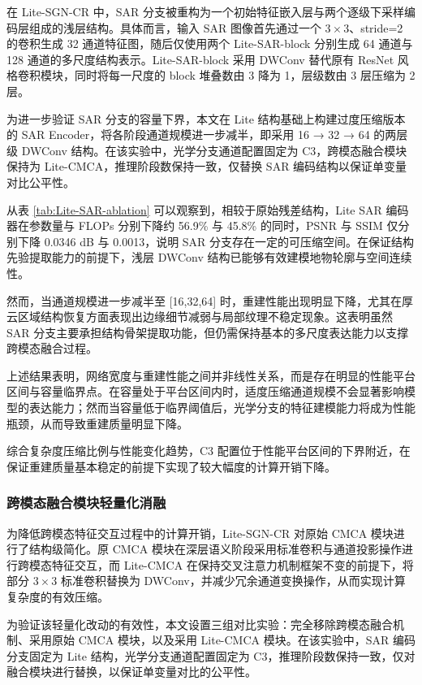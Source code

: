 在 Lite-SGN-CR 中，SAR 分支被重构为一个初始特征嵌入层与两个逐级下采样编码层组成的浅层结构。具体而言，输入 SAR 图像首先通过一个 $3\times3$、stride=2 的卷积生成 32 通道特征图，随后仅使用两个 Lite-SAR-block 分别生成 64 通道与 128 通道的多尺度结构表示。Lite-SAR-block 采用 DWConv 替代原有 ResNet 风格卷积模块，同时将每一尺度的 block 堆叠数由 3 降为 1，层级数由 3 层压缩为 2 层。

为进一步验证 SAR 分支的容量下界，本文在 Lite 结构基础上构建过度压缩版本的 SAR Encoder，将各阶段通道规模进一步减半，即采用 16 → 32 → 64 的两层级 DWConv 结构。在该实验中，光学分支通道配置固定为 C3，跨模态融合模块保持为 Lite-CMCA，推理阶段数保持一致，仅替换 SAR 编码结构以保证单变量对比公平性。

从表 \ref{tab:Lite-SAR-ablation} 可以观察到，相较于原始残差结构，Lite SAR 编码器在参数量与 FLOPs 分别下降约 56.9\% 与 45.8\% 的同时，PSNR 与 SSIM 仅分别下降 0.0346 dB 与 0.0013，说明 SAR 分支存在一定的可压缩空间。在保证结构先验提取能力的前提下，浅层 DWConv 结构已能够有效建模地物轮廓与空间连续性。

然而，当通道规模进一步减半至 [16,32,64] 时，重建性能出现明显下降，尤其在厚云区域结构恢复方面表现出边缘细节减弱与局部纹理不稳定现象。这表明虽然 SAR 分支主要承担结构骨架提取功能，但仍需保持基本的多尺度表达能力以支撑跨模态融合过程。

上述结果表明，网络宽度与重建性能之间并非线性关系，而是存在明显的性能平台区间与容量临界点。在容量处于平台区间内时，适度压缩通道规模不会显著影响模型的表达能力；然而当容量低于临界阈值后，光学分支的特征建模能力将成为性能瓶颈，从而导致重建质量明显下降。

综合复杂度压缩比例与性能变化趋势，C3 配置位于性能平台区间的下界附近，在保证重建质量基本稳定的前提下实现了较大幅度的计算开销下降。

\subsubsection{跨模态融合模块轻量化消融}

为降低跨模态特征交互过程中的计算开销，Lite-SGN-CR 对原始 CMCA 模块进行了结构级简化。原 CMCA 模块在深层语义阶段采用标准卷积与通道投影操作进行跨模态特征交互，而 Lite-CMCA 在保持交叉注意力机制框架不变的前提下，将部分 $3\times3$ 标准卷积替换为 DWConv，并减少冗余通道变换操作，从而实现计算复杂度的有效压缩。

为验证该轻量化改动的有效性，本文设置三组对比实验：完全移除跨模态融合机制、采用原始 CMCA 模块，以及采用 Lite-CMCA 模块。在该实验中，SAR 编码分支固定为 Lite 结构，光学分支通道配置固定为 C3，推理阶段数保持一致，仅对融合模块进行替换，以保证单变量对比的公平性。

